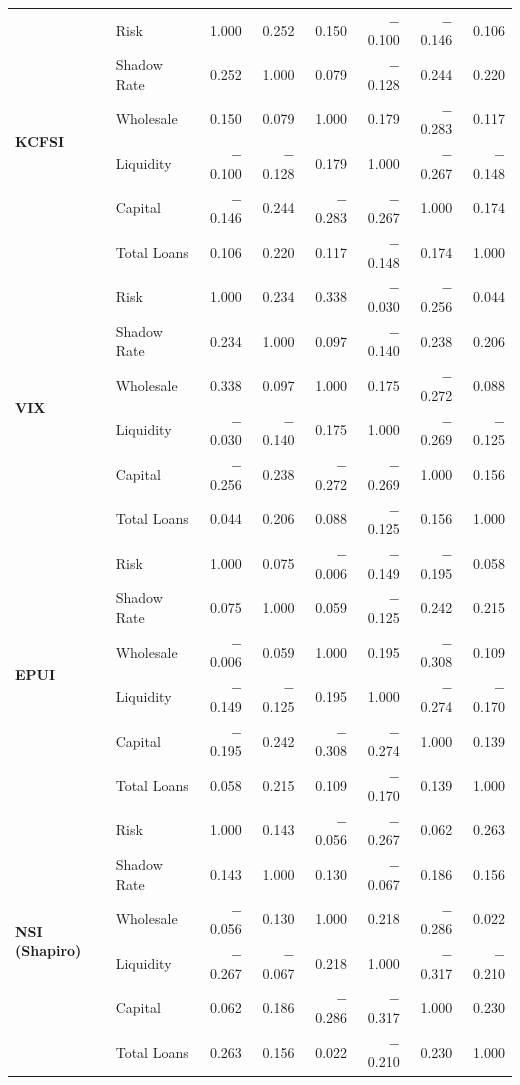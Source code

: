 \documentclass[12pt,a4paper]{report}
\begin{document}
\begin{table}[H]
{\begin{tabular}{ll rrrrrr}
\multirow{6}{*}{\textbf{KCFSI}}
 & Risk          &  1.000 &  0.252 &  0.150 & $-$0.100 & $-$0.146 &  0.106 \\
 & Shadow Rate   &  0.252 &  1.000 &  0.079 & $-$0.128 &  0.244 &  0.220 \\
 & Wholesale     &  0.150 &  0.079 &  1.000 &  0.179 & $-$0.283 &  0.117 \\
 & Liquidity     & $-$0.100 & $-$0.128 &  0.179 &  1.000 & $-$0.267 & $-$0.148 \\
 & Capital       & $-$0.146 &  0.244 & $-$0.283 & $-$0.267 &  1.000 &  0.174 \\
 & Total Loans   &  0.106 &  0.220 &  0.117 & $-$0.148 &  0.174 &  1.000 \\
\midrule

\multirow{6}{*}{\textbf{VIX}}
 & Risk          &  1.000 &  0.234 &  0.338 & $-$0.030 & $-$0.256 &  0.044 \\
 & Shadow Rate   &  0.234 &  1.000 &  0.097 & $-$0.140 &  0.238 &  0.206 \\
 & Wholesale     &  0.338 &  0.097 &  1.000 &  0.175 & $-$0.272 &  0.088 \\
 & Liquidity     & $-$0.030 & $-$0.140 &  0.175 &  1.000 & $-$0.269 & $-$0.125 \\
 & Capital       & $-$0.256 &  0.238 & $-$0.272 & $-$0.269 &  1.000 &  0.156 \\
 & Total Loans   &  0.044 &  0.206 &  0.088 & $-$0.125 &  0.156 &  1.000 \\
\midrule

\multirow{6}{*}{\textbf{EPUI}}
 & Risk          &  1.000 &  0.075 & $-$0.006 & $-$0.149 & $-$0.195 &  0.058 \\
 & Shadow Rate   &  0.075 &  1.000 &  0.059 & $-$0.125 &  0.242 &  0.215 \\
 & Wholesale     & $-$0.006 &  0.059 &  1.000 &  0.195 & $-$0.308 &  0.109 \\
 & Liquidity     & $-$0.149 & $-$0.125 &  0.195 &  1.000 & $-$0.274 & $-$0.170 \\
 & Capital       & $-$0.195 &  0.242 & $-$0.308 & $-$0.274 &  1.000 &  0.139 \\
 & Total Loans   &  0.058 &  0.215 &  0.109 & $-$0.170 &  0.139 &  1.000 \\
\midrule

\multirow{6}{*}{\textbf{NSI (Shapiro)}}
 & Risk          &  1.000 &  0.143 & $-$0.056 & $-$0.267 &  0.062 &  0.263 \\
 & Shadow Rate   &  0.143 &  1.000 &  0.130 & $-$0.067 &  0.186 &  0.156 \\
 & Wholesale     & $-$0.056 &  0.130 &  1.000 &  0.218 & $-$0.286 &  0.022 \\
 & Liquidity     & $-$0.267 & $-$0.067 &  0.218 &  1.000 & $-$0.317 & $-$0.210 \\
 & Capital       &  0.062 &  0.186 & $-$0.286 & $-$0.317 &  1.000 &  0.230 \\
 & Total Loans   &  0.263 &  0.156 &  0.022 & $-$0.210 &  0.230 &  1.000 \\
\midrule


\end{tabular}}
\end{table}
\end{document}
